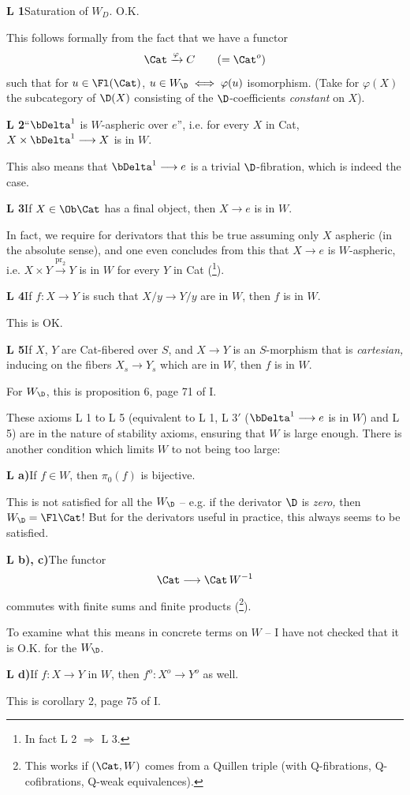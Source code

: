 \textbf{L 1}\enspace Saturation of $W_D$. O.K.

This follows formally from the fact that we have a functor
\[
\Cat \xrightarrow{\varphi} C \qquad (= \Cat^o)
\]
such that for $u \in \Fl(\Cat)$, $u \in W_{\D} \iff \varphi(u)$ isomorphism. (Take for $\varphi(X)$ the subcategory of $\D(X)$ consisting of the $\D$-coefficients \textit{constant} on $X$).

\textbf{L 2}\enspace ``$\bDelta^1$ is $W$-aspheric over $e$'', i.e. for every $X$ in Cat, $X \times \bDelta^1 \longrightarrow X$ is in $W$.

This also means that $\bDelta^1 \longrightarrow e$ is a trivial $\D$-fibration, which is indeed the case.

\clearpage


\textbf{L 3}\enspace If $X \in \Ob\Cat$ has a final object, then $X \longrightarrow e$ is in $W$.

In fact, we require for derivators that this be true assuming only $X$ aspheric (in the absolute sense), and one even concludes from this that $X \longrightarrow e$ is $W$-aspheric, i.e. $X \times Y \xrightarrow{\mathrm{pr}_2} Y$ is in $W$ for every $Y$ in Cat (\footnote{In fact L 2 $\Longrightarrow$ L 3.}).

\textbf{L 4}\enspace If $f : X \longrightarrow Y$ is such that $X/y \longrightarrow Y/y$ are in $W$, then $f$ is in $W$.

This is OK.

\textbf{L 5}\enspace If $X$, $Y$ are Cat-fibered over $S$, and $X \longrightarrow Y$ is an $S$-morphism that is \textit{cartesian,} inducing on the fibers $X_s \longrightarrow Y_s$ which are in $W$, then $f$ is in $W$.

For $W_{\D}$, this is proposition 6, page 71 of I.

These axioms L 1 to L 5 (equivalent to L 1, L 3$'$ ($\bDelta^1 \longrightarrow e$ is in $W$) and L 5) are in the nature of stability axioms, ensuring that $W$ is large enough. There is another condition which limits $W$ to not being too large:

\textbf{L a)}\enspace If $f \in W$, then $\pi_0(f)$ is bijective.

This is not satisfied for all the $W_{\D}$ – e.g. if the derivator $\D$ is \textit{zero,} then $W_{\D} = \Fl\Cat$! But for the derivators useful in practice, this always seems to be satisfied.

\textbf{L b), c)}\enspace The functor
\[
\Cat \longrightarrow \Cat\, W^{-1}
\]
commutes with finite sums and finite products (\footnote{This works if $(\Cat, W)$ comes from a Quillen triple (with Q-fibrations, Q-cofibrations, Q-weak equivalences).}).

To examine what this means in concrete terms on $W$ – I have not checked that it is O.K. for the $W_{\D}$.

\textbf{L d)}\enspace If $f : X \longrightarrow Y$ in $W$, then $f^o : X^o \longrightarrow Y^o$ as well.

This is corollary 2, page 75 of I.